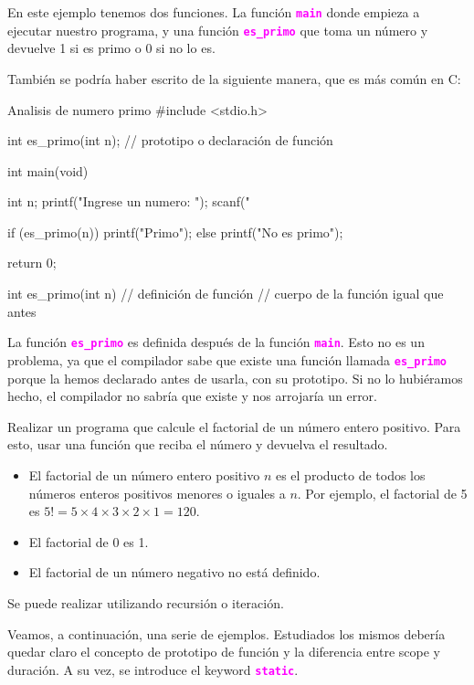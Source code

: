 \documentclass[]{scrartcl}
\newcommand{\hl}[1]{\textcolor{magenta}{\textbf{\texttt{#1}}}}
\begin{document}
En este ejemplo tenemos dos funciones. La función \hl{main} donde empieza a ejecutar nuestro programa, y una función \hl{es\_primo} que toma un número y devuelve 1 si es primo o 0 si no lo es.

También se podría haber escrito de la siguiente manera, que es más común en C:

\begin{cbox}[]{Analisis de numero primo}
  #include <stdio.h>
  
  int es_primo(int n);    // prototipo o declaración de función

  int main(void) {
    int n;
    printf("Ingrese un numero: ");
    scanf("%
            
    if (es_primo(n)) {
      printf("Primo\n");
    } else {
      printf("No es primo\n");
    }
                
    return 0;
  }

  int es_primo(int n) {     // definición de función
    // cuerpo de la función igual que antes
  }

\end{cbox}

La función \hl{es\_primo} es definida después de la función \hl{main}. Esto no es un problema, ya que el compilador sabe que existe una función llamada \hl{es\_primo} porque la hemos declarado antes de usarla, con su prototipo. Si no lo hubiéramos hecho, el compilador no sabría que existe y nos arrojaría un error.

\begin{exbox}
  Realizar un programa que calcule el factorial de un número entero positivo. Para esto, usar una función que reciba el número y devuelva el resultado.
  \begin{itemize}
    \item El factorial de un número entero positivo $n$ es el producto de todos los números enteros positivos menores o iguales a $n$. Por ejemplo, el factorial de 5 es $5! = 5 \times 4 \times 3 \times 2 \times 1 = 120$.
    \item El factorial de 0 es 1.
    \item El factorial de un número negativo no está definido.
  \end{itemize}
  Se puede realizar utilizando recursión o iteración.
\end{exbox}

Veamos, a continuación, una serie de ejemplos. Estudiados los mismos debería quedar claro el concepto de prototipo de función y la diferencia entre scope y duración. A su vez, se introduce el keyword \hl{static}.
\end{document}
